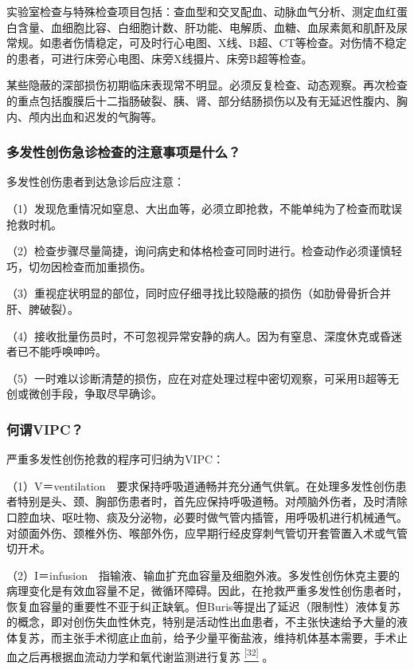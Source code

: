 实验室检查与特殊检查项目包括：查血型和交叉配血、动脉血气分析、测定血红蛋白含量、血细胞比容、白细胞计数、肝功能、电解质、血糖、血尿素氮和肌酐及尿常规。如患者伤情稳定，可及时行心电图、X线、B超、CT等检查。对伤情不稳定的患者，可进行床旁心电图、床旁X线摄片、床旁B超等检查。

某些隐蔽的深部损伤初期临床表现常不明显。必须反复检查、动态观察。再次检查的重点包括腹膜后十二指肠破裂、胰、肾、部分结肠损伤以及有无延迟性腹内、胸内、颅内出血和迟发的气胸等。

\subsubsection{多发性创伤急诊检查的注意事项是什么？}

多发性创伤患者到达急诊后应注意：

（1）发现危重情况如窒息、大出血等，必须立即抢救，不能单纯为了检查而耽误抢救时机。

（2）检查步骤尽量简捷，询问病史和体格检查可同时进行。检查动作必须谨慎轻巧，切勿因检查而加重损伤。

（3）重视症状明显的部位，同时应仔细寻找比较隐蔽的损伤（如肋骨骨折合并肝、脾破裂）。

（4）接收批量伤员时，不可忽视异常安静的病人。因为有窒息、深度休克或昏迷者已不能呼唤呻吟。

（5）一时难以诊断清楚的损伤，应在对症处理过程中密切观察，可采用B超等无创或微创手段，争取尽早确诊。

\subsubsection{何谓VIPC？}

严重多发性创伤抢救的程序可归纳为VIPC：

（1）V＝ventilation　要求保持呼吸道通畅并充分通气供氧。在处理多发性创伤患者特别是头、颈、胸部伤患者时，首先应保持呼吸道畅。对颅脑外伤者，及时清除口腔血块、呕吐物、痰及分泌物，必要时做气管内插管，用呼吸机进行机械通气。对颌面外伤、颈椎外伤、喉部外伤，应早期行经皮穿刺气管切开套管置入术或气管切开术。

（2）I＝infusion　指输液、输血扩充血容量及细胞外液。多发性创伤休克主要的病理变化是有效血容量不足，微循环障碍。因此，在抢救严重多发性创伤患者时，恢复血容量的重要性不亚于纠正缺氧。但Buris等提出了延迟（限制性）液体复苏的概念，即对创伤失血性休克，特别是活动性出血患者，不主张快速给予大量的液体复苏，而主张手术彻底止血前，给予少量平衡盐液，维持机体基本需要，手术止血之后再根据血流动力学和氧代谢监测进行复苏
\protect\hyperlink{text00024.htmlux5cux23ch32-23}{\textsuperscript{{[}32{]}}}
。

